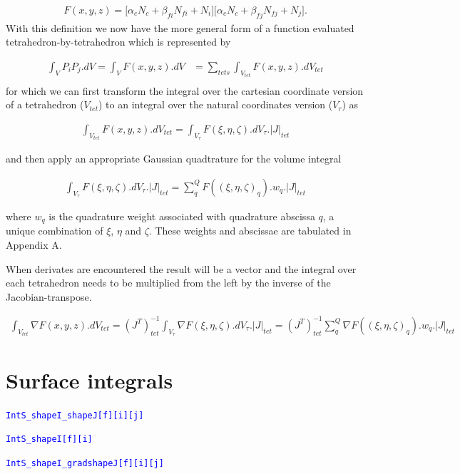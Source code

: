 \documentclass[11pt,letterpaper,titlepage]{article}
\newcommand{\beq}{\begin{equation*}
\begin{aligned}}
\newcommand{\eeq}{\end{aligned}
\end{equation*}}
\newcommand{\beqn}{\begin{equation}
	\begin{aligned}}
\newcommand{\eeqn}{\end{aligned}
	\end{equation}}
\newcommand{\xmltag}[1]{\textcolor{blue}{ \texttt{#1}} }
\begin{document}
\beq 
F(x,y,z) = \biggr[  
\alpha_c N_c + \beta_{fi} N_{fi} + N_i
\biggr] 
\biggr[  
\alpha_c N_c + 
\beta_{fj} N_{fj} + 
N_j
\biggr].
\eeq
\newline
With this definition we now have the more general form of a function evaluated tetrahedron-by-tetrahedron which is represented by

\beqn 
\int_V P_i P_j .dV = \int_V F(x,y,z) .dV 
&=\sum_{tets}
\int_{V_{tet}}
F(x,y,z) .dV_{tet}\\
\eeqn
\newline
for which we can first transform the integral over the cartesian coordinate version of a tetrahedron ($V_{tet}$) to an integral over the natural coordinates version ($V_{\tau}$) as

\beqn 
\int_{V_{tet}}
F(x,y,z) .dV_{tet} = \int_{V_{\tau}}
F(\xi,\eta,\zeta) .dV_{\tau}.|J|_{tet}
\eeqn

and then apply an appropriate Gaussian quadtrature for the volume integral

\beqn 
\int_{V_{\tau}}
F(\xi,\eta,\zeta) .dV_{\tau}.|J|_{tet}
= \sum_q^Q  F((\xi,\eta,\zeta)_q).w_q.|J|_{tet}
\eeqn

where $w_q$ is the quadrature weight associated with quadrature abscissa $q$, a unique combination of $\xi$, $\eta$ and $\zeta$. These weights and abscissae are tabulated in Appendix A.
\newline

When derivates are encountered the result will be a vector and the integral over each tetrahedron needs to be multiplied from the left by the inverse of the Jacobian-transpose.

\beqn 
\int_{V_{tet}}
\nabla F(x,y,z) .dV_{tet} =
(J^T)_{tet}^{-1}
\int_{V_{\tau}}
\nabla F(\xi,\eta,\zeta) .dV_{\tau}.|J|_{tet}
= (J^T)_{tet}^{-1}\sum_q^Q \nabla F((\xi,\eta,\zeta)_q).w_q.|J|_{tet}
\eeqn




\newpage 
{}
\section{Surface integrals}
\xmltag{IntS\_shapeI\_shapeJ[f][i][j]}

\xmltag{IntS\_shapeI[f][i]}

\xmltag{IntS\_shapeI\_gradshapeJ[f][i][j]}
\end{document}
